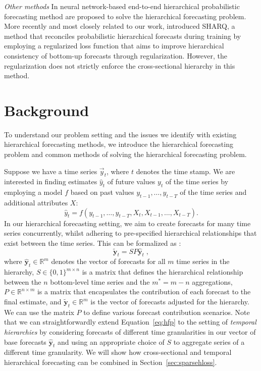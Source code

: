 \documentclass[preprint, 3p, times, twocolumn]{elsarticle}
\begin{document}
\textit{Other methods} In \cite{rangapuram_endtoend_2021,rangapuram_coherent_2023} neural network-based end-to-end hierarchical probabilistic forecasting method are proposed to solve the hierarchical forecasting problem. More recently and most closely related to our work, \citet{han_simultaneously_2021} introduced SHARQ, a method that reconciles probabilistic hierarchical forecasts during training by employing a regularized loss function that aims to improve hierarchical consistency of bottom-up forecasts through regularization. However, the regularization does not strictly enforce the cross-sectional hierarchy in this method.

\section{Background} \label{sec:background}
To understand our problem setting and the issues we identify with existing hierarchical forecasting methods, we introduce the hierarchical forecasting problem and common methods of solving the hierarchical forecasting problem.

Suppose we have a time series \(\vec{y}_t\), where \(t\) denotes the time stamp. We are interested in finding estimates \(\hat{y}_{t}\) of future values \({y}_{t}\) of the time series by employing a model \(f\) based on past values \(y_{t-1}, \dots, y_{t-T}\) of the time series and additional attributes \(X\):
\begin{equation}
  \hat{y}_{t} = f(y_{t-1}, \dots, y_{t-T}, X_{t}, X_{t-1}, \dots, X_{t-T}).
\end{equation}
In our hierarchical forecasting setting, we aim to create forecasts for many time series concurrently, whilst adhering to pre-specified hierarchical relationships that exist between the time series. This can be formalized as \cite{hyndman_forecasting_2021}:
\begin{equation} \label{eq:hfp}
  \tilde{\textbf{y}}_{t} = SP\hat{\textbf{y}}_{t} \;,
\end{equation}
where \(\hat{\textbf{y}}_{t} \in \mathbb{R}^{m} \) denotes the vector of forecasts for all \(m\) time series in the hierarchy, \(S \in \{0, 1\}^{m \times n}\) is a matrix that defines the hierarchical relationship between the \(n\) bottom-level time series and the \(m^* = m - n\) aggregations, \(P \in \mathbb{R}^{n \times m}\) is a matrix that encapsulates the contribution of each forecast to the final estimate, and \(\tilde{\textbf{y}}_{t} \in \mathbb{R}^{m} \) is the vector of forecasts adjusted for the hierarchy. We can use the matrix \(P\) to define various forecast contribution scenarios. Note that we can straightforwardly extend Equation~\eqref{eq:hfp} to the setting of \textit{temporal hierarchies} \cite{athanasopoulos_forecasting_2017,rangapuram_coherent_2023} by considering forecasts of different time granularities in our vector of base forecasts \(\hat{\textbf{y}}_{t}\) and using an appropriate choice of \(S\) to aggregate series of a different time granularity. We will show how cross-sectional and temporal hierarchical forecasting can be combined in Section~\ref{sec:sparsehloss}.
\end{document}
